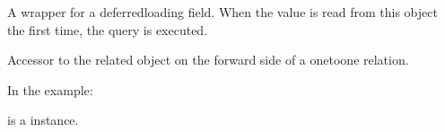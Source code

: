 \documentclass[letterpaper,11pt,polish]{sphinxmanual}
\begin{document}
\begin{fulllineitems}
\begin{fulllineitems}
\end{fulllineitems}


\begin{fulllineitems}
\label{\detokenize{mainApp:mainApp.models.UserProfile.id}}
\pysigstartsignatures
{}
\pysigstopsignatures
\sphinxAtStartPar
A wrapper for a deferred\sphinxhyphen{}loading field. When the value is read from this
object the first time, the query is executed.

\end{fulllineitems}


\begin{fulllineitems}
\label{\detokenize{mainApp:mainApp.models.UserProfile.objects}}
\pysigstartsignatures
{}
\pysigstopsignatures
\end{fulllineitems}


\begin{fulllineitems}
\label{\detokenize{mainApp:mainApp.models.UserProfile.totp_device}}
\pysigstartsignatures
{}
\pysigstopsignatures
\sphinxAtStartPar
Accessor to the related object on the forward side of a one\sphinxhyphen{}to\sphinxhyphen{}one relation.

\sphinxAtStartPar
In the example:

\begin{sphinxVerbatim}[commandchars=\\\{\}]
 
       
\end{sphinxVerbatim}

\sphinxAtStartPar
{} is a  instance.


\end{fulllineitems}
\end{fulllineitems}
\end{document}

